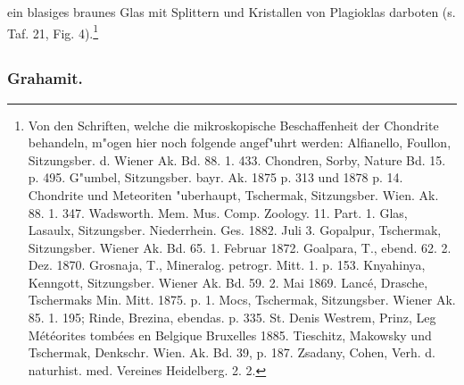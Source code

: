 \documentclass[a4paper, 11pt, oneside, polutonikogreek, german]{article}
\begin{document}
ein blasiges braunes Glas mit Splittern und Kristallen von Plagioklas darboten (s. Taf. 21, Fig. 4).\footnote{Von den Schriften, welche die mikroskopische Beschaffenheit der Chondrite behandeln, m"ogen hier noch folgende angef"uhrt werden: Alfianello, Foullon, Sitzungsber. d. Wiener Ak. Bd. 88. 1. 433. Chondren, Sorby, Nature Bd. 15. p. 495. G"umbel, Sitzungsber. bayr. Ak. 1875 p. 313 und 1878 p. 14. Chondrite und Meteoriten "uberhaupt, Tschermak, Sitzungsber. Wien. Ak. 88. 1. 347. Wadsworth. Mem. Mus. Comp. Zoology. 11. Part. 1. Glas, Lasaulx, Sitzungsber. Niederrhein. Ges. 1882. Juli 3. Gopalpur, Tschermak, Sitzungsber. Wiener Ak. Bd. 65. 1. Februar 1872. Goalpara, T., ebend. 62. 2. Dez. 1870. Grosnaja, T., Mineralog. petrogr. Mitt. 1. p. 153. Knyahinya, Kenngott, Sitzungsber. Wiener Ak. Bd. 59. 2. Mai 1869. Lancé, Drasche, Tschermaks Min. Mitt. 1875. p. 1. Mocs, Tschermak, Sitzungsber. Wiener Ak. 85. 1. 195; Rinde, Brezina, ebendas. p. 335. St. Denis Westrem, Prinz, Leg Météorites tombées en Belgique Bruxelles 1885. Tieschitz, Makowsky und Tschermak, Denkschr. Wien. Ak. Bd. 39, p. 187. Zsadany, Cohen, Verh. d. naturhist. med. Vereines Heidelberg. 2. 2.}
\clearpage
\subsection{}
\subsubsection{Grahamit.}
\end{document}

